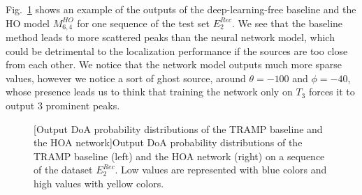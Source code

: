 Fig.~\ref{fig:output_visualization} shows an example of the outputs of the deep-learning-free baseline and the HO model $M^{HO}_{6,4}$ for one sequence of the test set $E^{Rec}_2$. We see that the baseline method leads to more scattered peaks than the neural network model, which could be detrimental to the localization performance if the sources are too close from each other. We notice that the network model outputs much more sparse values, however we notice a sort of ghost source, around $\theta=-100$ and $\phi=-40$, whose presence leads us to think that training the network only on $T_3$ forces it to output $3$ prominent peaks.

\begin{figure}[t]
    \centering
    
    [Output DoA probability distributions of the TRAMP baseline and the HOA network]{Output DoA probability distributions of the TRAMP baseline (left) and the HOA network (right) on a sequence of the dataset $E^{Rec}_2$. Low values are represented with blue colors and high values with yellow colors.}
    \label{fig:output_visualization}
\end{figure}


